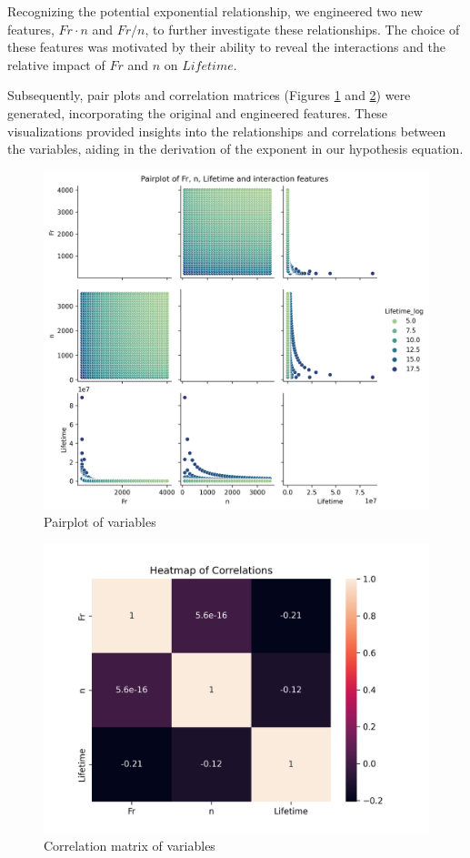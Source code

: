 Recognizing the potential exponential relationship, we engineered two new features, $Fr \cdot n$ and $Fr/n$, to further investigate these relationships. The choice of these features was motivated by their ability to reveal the interactions and the relative impact of $Fr$ and $n$ on $Lifetime$.

Subsequently, pair plots and correlation matrices (Figures \ref{fig:bearings-pairplot} and \ref{fig:bearings-corrmat}) were generated, incorporating the original and engineered features. These visualizations provided insights into the relationships and correlations between the variables, aiding in the derivation of the exponent in our hypothesis equation.

\begin{figure}[ht]
    \centering
    \includegraphics[width=\textwidth]{assets/bearings-eda/pairplot.png}
    \caption{Pairplot of variables}
    \label{fig:bearings-pairplot}
\end{figure}

\begin{figure}[ht]
    \centering
    \includegraphics[width=\textwidth]{assets/bearings-eda/correlation-matrix.png}
    \caption{Correlation matrix of variables}
    \label{fig:bearings-corrmat}
\end{figure}

